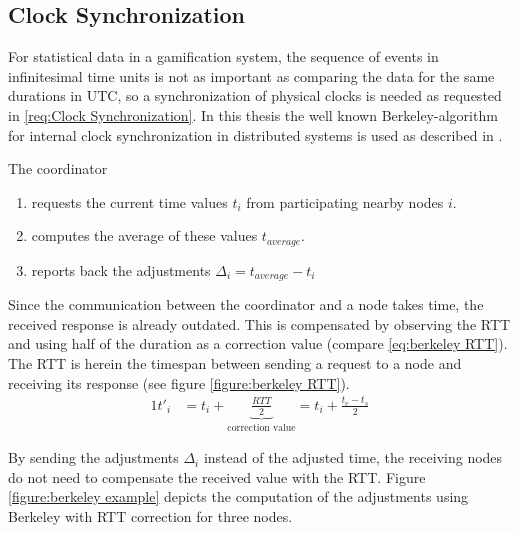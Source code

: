 \subsection{Clock Synchronization} \label{Clock synchronization}

For statistical data in a gamification system, the sequence of events in infinitesimal time units is not as important as comparing the data for the same durations in \gls{UTC}, so a synchronization of physical clocks is needed as requested in \ref{req:Clock Synchronization}. In this thesis  the well known Berkeley-algorithm for internal clock synchronization in distributed systems is used as described in \textcite{Ghosh2015}.

\noindent The coordinator
\begin{enumerate}
	\item requests the current time values $t_i$ from participating nearby nodes $i$.
	\item computes the average of these values $t_{average}$.
	\item reports back the adjustments $\Delta_{i}=t_{average}-t_i$
\end{enumerate}

Since the communication between the coordinator and a node takes time, the received response is already outdated. This is compensated by observing the \gls{RTT} and using half of the duration as a correction value (compare \ref{eq:berkeley RTT}). The \gls{RTT} is herein the timespan between sending a request to a node and receiving its response (see figure \ref{figure:berkeley RTT}).
\begin{alignat}{1}
t'_i &=t_i+\underbrace{\frac{RTT}{2}}_{\text{correction value}}=t_i+\frac{t_e-t_s}{2} \label{eq:berkeley RTT}
\end{alignat}


By sending the adjustments $\Delta_i$ instead of the adjusted time, the receiving nodes do not need to compensate the received value with the \gls{RTT}. Figure \ref{figure:berkeley example} depicts the computation of the adjustments using Berkeley with \gls{RTT} correction for three nodes. 


